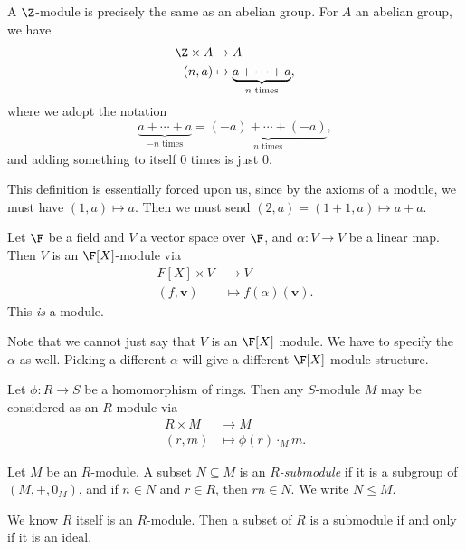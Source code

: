 \documentclass[a4paper]{article}
\begin{document}
\begin{eg}
  A $\Z$-module is precisely the same as an abelian group. For $A$ an abelian group, we have
  \begin{align*}
    \Z \times A &\to A\\
    (n, a) &\mapsto \underbrace{a + \cdots + a}_{n\text{ times}},
  \end{align*}
  where we adopt the notation
  \[
    \underbrace{a + \cdots + a}_{-n\text{ times}} = \underbrace{(-a) + \cdots + (-a)}_{n\text{ times}},
  \]
  and adding something to itself $0$ times is just $0$.

  This definition is essentially forced upon us, since by the axioms of a module, we must have $(1, a) \mapsto a$. Then we must send $(2, a) = (1 + 1, a) \mapsto a + a$.
\end{eg}

\begin{eg}
  Let $\F$ be a field and $V$ a vector space over $\F$, and $\alpha: V \to V$ be a linear map. Then $V$ is an $\F[X]$-module via
  \begin{align*}
    F[X] \times V &\to V\\
    (f, \mathbf{v}) & \mapsto f(\alpha) (\mathbf{v}).
  \end{align*}
  This \emph{is} a module.

  Note that we cannot just say that $V$ is an $\F[X]$ module. We have to specify the $\alpha$ as well. Picking a different $\alpha$ will give a different $\F[X]$-module structure.
\end{eg}

\begin{eg}
  Let $\phi: R \to S$ be a homomorphism of rings. Then any $S$-module $M$ may be considered as an $R$ module via
  \begin{align*}
    R\times M &\to M\\
    (r, m) &\mapsto \phi(r) \cdot_M m.
  \end{align*}
\end{eg}

\begin{defi}[Submodule]
  Let $M$ be an $R$-module. A subset $N \subseteq M$ is an \emph{$R$-submodule} if it is a subgroup of $(M, +, 0_M)$, and if $n \in N$ and $r \in R$, then $rn \in N$. We write $N \leq M$.
\end{defi}

\begin{eg}
  We know $R$ itself is an $R$-module. Then a subset of $R$ is a submodule if and only if it is an ideal.
\end{eg}
\end{document}
